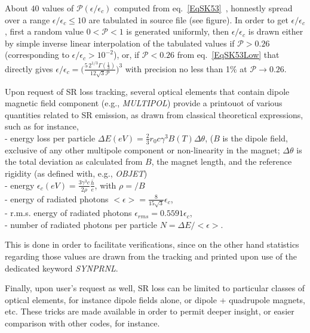  About $40$ values of $\mathcal{P}(\epsilon/\epsilon_c)$ computed from eq.~\ref{EqSK53}~\cite{VOKostroun}, 
honnestly spread  over a range $\epsilon/\epsilon_c \leq 10$ are  tabulated 
in \zgoubi source file (see figure). In 
order to get $\epsilon/\epsilon_c$, first a random value $0<\mathcal{P}<1$ is generated uniformly, 
then  $\epsilon/\epsilon_c$ is drawn either  by simple inverse linear interpolation 
 of the tabulated values if $\mathcal{P}>0.26$ (corresponding to 
$\epsilon/\epsilon_c>10^{-2}$), 
or, if $\mathcal{P}<0.26$ from eq.~\ref{EqSK53Low} that directly gives 
 $\epsilon/\epsilon_c= \bigl( \frac{5 \, 2^{1/3} \Gamma(\frac{1}{3})}{12 \sqrt{3} \mathcal{P}}\bigr)^3$ 
 with precision no less than 1$\%$ at  $\mathcal{P}\rightarrow 0.26$. 

\bigskip


Upon request of SR loss tracking, several optical elements that contain dipole 
magnetic field component (e.g., \textsl{MULTIPOL}) provide a printouot of various 
 quantities related to SR emission, as drawn from classical theoretical 
expressions, such as for instance, \\
- energy loss per particle $\Delta E(eV)= \frac{2}{3}r_0 c \gamma^3 B(T) \Delta \theta$,   ($B$ 
is the dipole field, exclusive of any other multipole component or non-linearity 
in the magnet; $\Delta \theta$ is the total deviation as calculated from $B$, the 
magnet length, and the reference rigidity \BORO (as defined with, e.g., \textsl{OBJET}) \\
- energy $\epsilon_c(eV)=\frac{3 \gamma^3 c}{2 \rho} \frac{\bar{h}}{e}$, with 
$\rho =$\BORO$/B$ \\
- energy of radiated photons $<\epsilon> = \frac{8}{15 \sqrt{3}} \epsilon_c$, \\ 
- r.m.s. energy of radiated photons $\epsilon_{rms} = 0.5591 \epsilon_c$, \\
- number of radiated photons per particle  $N = \Delta E /<\epsilon>$.  

This is done in order to facilitate verifications, since on the other hand statistics 
regarding those values are drawn from the tracking and printed upon use of the dedicated 
keyword \textsl{SYNPRNL}. 



\bigskip

Finally, upon user's request as well,  SR loss can be limited to particular classes of optical 
elements, for instance dipole fields alone, or dipole + quadrupole magnets, etc. These tricks 
are made available in order to permit deeper insight, or easier comparison with other codes, 
for instance. 

